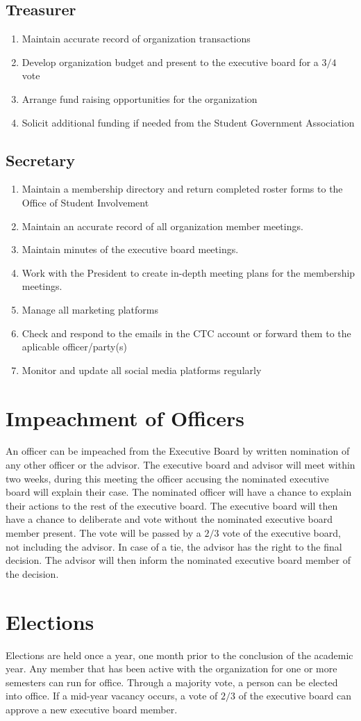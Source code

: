 \documentclass{article}
\newcommand{\article}[1]{\section{#1} \label{#1}}
\newcommand{\asection}[1]{\subsection{#1} \label{#1}}
\begin{document}
\asection{Treasurer}
\begin{enumerate}
\item Maintain accurate record of organization transactions
\item Develop organization budget and present to the executive board for a $3/4$ vote
\item Arrange fund raising opportunities for the organization
\item Solicit additional funding if needed from the Student Government Association
\end{enumerate}

\asection {Secretary}
\begin{enumerate}
\item Maintain a membership directory and return completed roster forms to the Office of Student Involvement
\item Maintain an accurate record of all organization member meetings.
\item Maintain minutes of the executive board meetings.
\item Work with the President to create in-depth meeting plans for the membership meetings.
\item Manage all marketing platforms
\item Check and respond to the emails in the CTC account or forward them to the aplicable officer/party(s)
\item Monitor and update all social media platforms regularly
\end{enumerate}

\article{Impeachment of Officers}
An officer can be impeached from the Executive Board by written nomination of any other officer or the advisor. 
The executive board and advisor will meet within two weeks, during this meeting the officer accusing the nominated executive board will explain their case. 
The nominated officer will have a chance to explain their actions to the rest of the executive board. 
The executive board will then have a chance to deliberate and vote without the nominated executive board member present. 
The vote will be passed by a $2/3$ vote of the executive board, not including the advisor. 
In case of a tie, the advisor has the right to the final decision. 
The advisor will then inform the nominated executive board member of the decision.

\article{Elections}
Elections are held once a year, one month prior to the conclusion of the academic year. 
Any member that has been active with the organization for one or more semesters can run for office. 
Through a majority vote, a person can be elected into office. 
If a mid-year vacancy occurs, a vote of $2/3$ of the executive board can approve a new executive board member.
\end{document}
